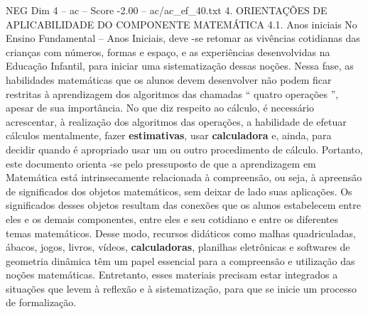 \begin{textsample}{NEG Dim 4 – ac – Score -2.00 – ac/ac\_ef\_40.txt}  \label{ex:f4_neg_045}
4.
ORIENTAÇÕES DE APLICABILIDADE DO COMPONENTE MATEMÁTICA 4.1.
Anos iniciais No Ensino Fundamental – Anos Iniciais, deve -se retomar as vivências cotidianas das crianças com números, formas e espaço, e as experiências desenvolvidas na Educação Infantil, para iniciar uma sistematização dessas noções.
Nessa fase, as habilidades matemáticas que os alunos devem desenvolver não podem ficar restritas à aprendizagem dos algoritmos das chamadas “ quatro operações ”, apesar de sua importância.
No que diz respeito ao cálculo, é necessário acrescentar, à realização dos algoritmos das operações, a habilidade de efetuar cálculos mentalmente, fazer \textbf{estimativas}, usar \textbf{calculadora} e, ainda, para decidir quando é apropriado usar um ou outro procedimento de cálculo.
Portanto, este documento orienta -se pelo pressuposto de que a aprendizagem em Matemática está intrinsecamente relacionada à compreensão, ou seja, à apreensão de significados dos objetos matemáticos, sem deixar de lado suas aplicações.
Os significados desses objetos resultam das conexões que os alunos estabelecem entre eles e os demais componentes, entre eles e seu cotidiano e entre os diferentes temas matemáticos.
Desse modo, recursos didáticos como malhas quadriculadas, ábacos, jogos, livros, vídeos, \textbf{calculadoras}, planilhas eletrônicas e softwares de geometria dinâmica têm um papel essencial para a compreensão e utilização das noções matemáticas.
Entretanto, esses materiais precisam estar integrados a situações que levem à reflexão e à sistematização, para que se inicie um processo de formalização.

\end{textsample}
